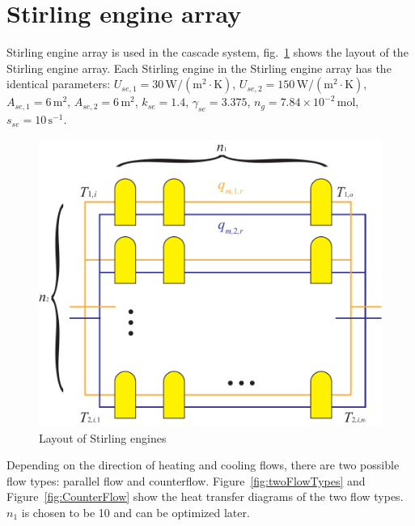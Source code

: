 
\section{Stirling engine array}
Stirling engine array is used in the cascade system, fig.~\ref{fig:Layout of Stirling engines} shows the layout of the Stirling engine array. Each Stirling engine in the Stirling engine array has the identical parameters: $U_{se,1}=30\,\mathrm{W/(m^2\cdot{}K)}$, $U_{se,2}=150\,\mathrm{W/(m^2\cdot{}K)}$, $A_{se,1}=6\,\mathrm{m^2}$, $A_{se,2}=6\,\mathrm{m^2}$, $k_{se}=1.4$, $\gamma_{se}=3.375$, $n_g=7.84\times{}10^{-2}\,\mathrm{mol}$, $s_{se}=10\,\mathrm{s^{-1}}$.

\noindent \begin{figure}[htbp]
\begin{center}
	\includegraphics[width = 0.6\columnwidth]{fig/stirlingEngineArray.pdf}
	\caption{Layout of Stirling engines}
	\label{fig:Layout of Stirling engines}
\end{center}
\end{figure}

Depending on the direction of heating and cooling flows, there are two possible flow types: parallel flow and counterflow. 
Figure~\ref{fig:twoFlowTypes} and 
Figure~\ref{fig:CounterFlow} show the heat transfer diagrams of the two flow types.
 $n_1$ is chosen to be 10 and can be optimized later.

